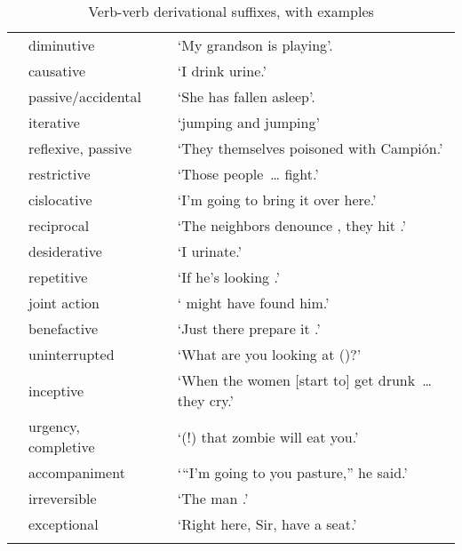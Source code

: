 \begin{table}[p]
\small\centering
\caption{Verb-verb derivational suffixes, with examples}\label{Tab27}
\begin{tabularx}{\textwidth}{l@{~}lL@{~}L}
\lsptoprule
{}	    & diminutive	&{}	&‘My grandson is playing’.\\
{}	    & causative		&{}	&‘I  drink urine.’\\
{}		& passive/accidental &{}	&‘She has fallen asleep’.\\
{}	& iterative	&{}	&‘jumping and jumping’\\
{}		& reflexive, passive	&{}	&‘They themselves poisoned  with Campión.’\\
{}	 & restrictive	&{}	&‘Those people~\dots{}  fight.’\\
{}		& cislocative	&{}	&‘I’m going to bring it over here.’\\
{}	& reciprocal		&{}	&‘The neighbors denounce , they hit .’\\
{}	& desiderative	&{}	&‘I  urinate.’\\
{}		& repetitive			&{}	&‘If he’s looking .’\\
{}&joint action		&{}	&‘ might have found him.’\\
{}		& benefactive		&{}	&‘Just there prepare it .’\\
{}		& uninterrupted		&{}	&‘What are you looking at ()?’\\
{}		& inceptive			&{} 	&‘When the women [start to] get drunk~\dots{} they cry.’\\
{}		& urgency, completive&{}	&‘(!) that zombie will eat you.’\\
{}	& accompaniment		&{}	&‘“I’m going to  you pasture,” he said.’\\
{}	& irreversible 		&{}	&‘The man .’\\
{}	& exceptional		&{}	&‘Right here, Sir,  have a seat.’\\
\lspbottomrule
\end{tabularx}
\end{table}

